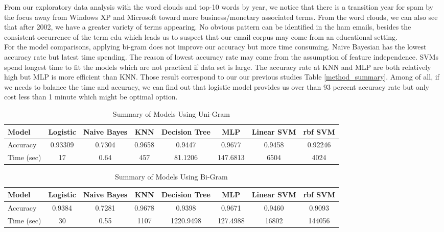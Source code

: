 From our exploratory data analysis with the word clouds and top-10 words by year, we notice that there is a transition year for spam by the focus away from Windows XP and Microsoft toward more business/monetary associated terms. From the word clouds, we can also see that after 2002, we have a greater variety of terms appearing. No obvious pattern can be identified in the ham emails, besides the consistent occurrence of the term edu which leads us to suspect that our email corpus may come from an educational setting.\\

For the model comparisons, applying bi-gram does not improve our accuracy but more time consuming. Naive Bayesian has the lowest accuracy rate but latest time spending. The reason of lowest accuracy rate may come from the assumption of feature independence. SVMs spend longest time to fit the models which are not practical if data set is large. The accuracy rate at KNN and MLP are both relatively high but MLP is more efficient than KNN. Those result correspond to our our previous studies Table \ref{method_summary}. Among of all, if we needs to balance the time and accuracy, we can find out that logistic model provides us over than 93 percent accuracy rate but only cost less than 1 minute which might be optimal option.

\begin{table}[H]
	\centering
	\caption{Summary of Models Using Uni-Gram}
	\label{Summary-one-gram}
	\begin{tabular}{lccccccc}
		\hline
		Model    & Logistic  & Naive Bayes & KNN    & Decision Tree & MLP & Linear SVM  & rbf SVM \\ \hline
		Accuracy&  0.93309   & 0.7304       & 0.9658 & 0.9447        & 0.9677 & 0.9458  & 0.92246 \\
		Time (sec) & 17 & 0.64 &  457 & 81.1206  & 147.6813 & 6504       & 4024    \\ \hline
	\end{tabular}
\end{table}

\begin{table}[H]
	\centering
	\caption{Summary of Models Using Bi-Gram}
	\label{Summary-bi-gram}
	\begin{tabular}{lccccccc}
		\hline
		Model      & Logistic & Naive Bayes & KNN    & Decision Tree & MLP & Linear SVM & rbf SVM \\ \hline
		Accuracy   & 0.9384   & 0.7281      & 0.9678 & 0.9398        &     0.9671 & 0.9460     & 0.9093  \\
		Time (sec) & 30       & 0.55        & 1107   & 1220.9498     &    127.4988 & 16802      & 144056  \\ \hline
	\end{tabular}
\end{table}
